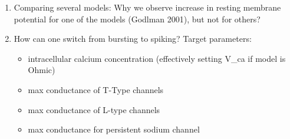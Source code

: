 \documentclass[11pt]{article}
\begin{document}
\begin{enumerate}
    \item Comparing several models: Why we observe increase in resting membrane potential
    for one of the models (Godlman 2001), but not for others?

    \item How can one switch from bursting to spiking? Target parameters:
    \begin{itemize}
        \item intracellular calcium concentration (effectively setting V\_ca if model is Ohmic)
        \item max conductance of T-Type channels
        \item max conductance of L-type channels
        \item max conductance for persistent sodium channel
    \end{itemize}
    

\end{enumerate}
\end{document}
